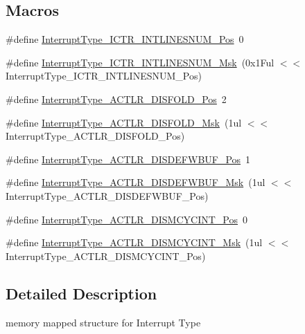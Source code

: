 \subsection*{Macros}
\begin{DoxyCompactItemize}
\item 
\#define \hyperlink{group__CMSIS__CM3__InterruptType_ga5d164b3cb981bd85afd35892d180a5c3}{Interrupt\+Type\+\_\+\+I\+C\+T\+R\+\_\+\+I\+N\+T\+L\+I\+N\+E\+S\+N\+U\+M\+\_\+\+Pos}~0
\item 
\#define \hyperlink{group__CMSIS__CM3__InterruptType_ga0a2c325cefdab97bd8ce3336a66a803e}{Interrupt\+Type\+\_\+\+I\+C\+T\+R\+\_\+\+I\+N\+T\+L\+I\+N\+E\+S\+N\+U\+M\+\_\+\+Msk}~(0x1\+Ful $<$$<$ Interrupt\+Type\+\_\+\+I\+C\+T\+R\+\_\+\+I\+N\+T\+L\+I\+N\+E\+S\+N\+U\+M\+\_\+\+Pos)
\item 
\#define \hyperlink{group__CMSIS__CM3__InterruptType_gaaa37f212111e6dbc9505d46b8bf8fa3e}{Interrupt\+Type\+\_\+\+A\+C\+T\+L\+R\+\_\+\+D\+I\+S\+F\+O\+L\+D\+\_\+\+Pos}~2
\item 
\#define \hyperlink{group__CMSIS__CM3__InterruptType_gac4d872ecfcf7dcb93f98824ada52a527}{Interrupt\+Type\+\_\+\+A\+C\+T\+L\+R\+\_\+\+D\+I\+S\+F\+O\+L\+D\+\_\+\+Msk}~(1ul $<$$<$ Interrupt\+Type\+\_\+\+A\+C\+T\+L\+R\+\_\+\+D\+I\+S\+F\+O\+L\+D\+\_\+\+Pos)
\item 
\#define \hyperlink{group__CMSIS__CM3__InterruptType_ga46fed31841c33811db8b3a9cbae6347b}{Interrupt\+Type\+\_\+\+A\+C\+T\+L\+R\+\_\+\+D\+I\+S\+D\+E\+F\+W\+B\+U\+F\+\_\+\+Pos}~1
\item 
\#define \hyperlink{group__CMSIS__CM3__InterruptType_ga3cecf9e9d75112aed3ed055343cbe23f}{Interrupt\+Type\+\_\+\+A\+C\+T\+L\+R\+\_\+\+D\+I\+S\+D\+E\+F\+W\+B\+U\+F\+\_\+\+Msk}~(1ul $<$$<$ Interrupt\+Type\+\_\+\+A\+C\+T\+L\+R\+\_\+\+D\+I\+S\+D\+E\+F\+W\+B\+U\+F\+\_\+\+Pos)
\item 
\#define \hyperlink{group__CMSIS__CM3__InterruptType_ga101a93632e4480073299b775bc5cbf12}{Interrupt\+Type\+\_\+\+A\+C\+T\+L\+R\+\_\+\+D\+I\+S\+M\+C\+Y\+C\+I\+N\+T\+\_\+\+Pos}~0
\item 
\#define \hyperlink{group__CMSIS__CM3__InterruptType_ga0c020eb28544979bfac2e219ed53c999}{Interrupt\+Type\+\_\+\+A\+C\+T\+L\+R\+\_\+\+D\+I\+S\+M\+C\+Y\+C\+I\+N\+T\+\_\+\+Msk}~(1ul $<$$<$ Interrupt\+Type\+\_\+\+A\+C\+T\+L\+R\+\_\+\+D\+I\+S\+M\+C\+Y\+C\+I\+N\+T\+\_\+\+Pos)
\end{DoxyCompactItemize}


\subsection{Detailed Description}
memory mapped structure for Interrupt Type 

